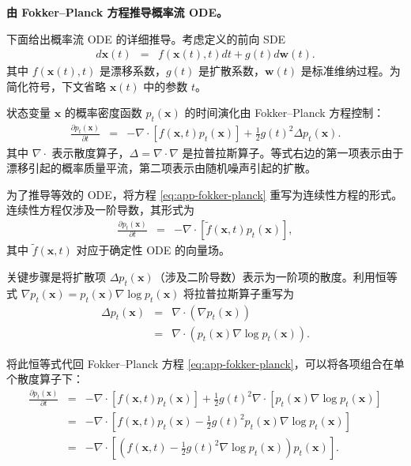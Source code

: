 \documentclass[UTF8,a4paper,zihao=-4,oneside,openany]{ctexbook}
\begin{document}
\textbf{由 Fokker--Planck 方程推导概率流 ODE。}

下面给出概率流 ODE 的详细推导。考虑定义的前向 SDE
\begin{eqnarray}
d\mathbf{x}(t) & = & f(\mathbf{x}(t), t) dt + g(t) d\mathbf{w}(t).
\end{eqnarray}
其中 $f(\mathbf{x}(t), t)$ 是漂移系数，$g(t)$ 是扩散系数，$\mathbf{w}(t)$ 是标准维纳过程。为简化符号，下文省略 $\mathbf{x}(t)$ 中的参数 $t$。

状态变量 $\mathbf{x}$ 的概率密度函数 $p_t(\mathbf{x})$ 的时间演化由 Fokker--Planck 方程控制：
\begin{eqnarray}
\frac{\partial p_t(\mathbf{x})}{\partial t} & = & -\nabla \cdot [f(\mathbf{x}, t) p_t(\mathbf{x})] + \frac{1}{2} g(t)^2 \Delta p_t(\mathbf{x}).
\label{eq:app-fokker-planck}
\end{eqnarray}
其中 $\nabla \cdot$ 表示散度算子，$\Delta = \nabla \cdot \nabla$ 是拉普拉斯算子。等式右边的第一项表示由于漂移引起的概率质量平流，第二项表示由随机噪声引起的扩散。

为了推导等效的 ODE，将方程 \eqref{eq:app-fokker-planck} 重写为连续性方程的形式。连续性方程仅涉及一阶导数，其形式为
\begin{eqnarray}
\frac{\partial p_t(\mathbf{x})}{\partial t} & = & -\nabla \cdot [\tilde{f}(\mathbf{x}, t) p_t(\mathbf{x})],
\label{eq:app-continuity}
\end{eqnarray}
其中 $\tilde{f}(\mathbf{x}, t)$ 对应于确定性 ODE 的向量场。

关键步骤是将扩散项 $\Delta p_t(\mathbf{x})$（涉及二阶导数）表示为一阶项的散度。利用恒等式 $\nabla p_t(\mathbf{x}) = p_t(\mathbf{x}) \nabla \log p_t(\mathbf{x})$ 将拉普拉斯算子重写为
\begin{eqnarray}
\Delta p_t(\mathbf{x}) & = & \nabla \cdot (\nabla p_t(\mathbf{x})) \nonumber \\
& = & \nabla \cdot (p_t(\mathbf{x}) \nabla \log p_t(\mathbf{x})).
\end{eqnarray}

将此恒等式代回 Fokker--Planck 方程 \eqref{eq:app-fokker-planck}，可以将各项组合在单个散度算子下：
\begin{eqnarray}
\frac{\partial p_t(\mathbf{x})}{\partial t} & = & -\nabla \cdot [f(\mathbf{x}, t) p_t(\mathbf{x})] + \frac{1}{2} g(t)^2 \nabla \cdot [p_t(\mathbf{x}) \nabla \log p_t(\mathbf{x})] \nonumber \\
& = & -\nabla \cdot \left[ f(\mathbf{x}, t) p_t(\mathbf{x}) - \frac{1}{2} g(t)^2 p_t(\mathbf{x}) \nabla \log p_t(\mathbf{x}) \right] \nonumber \\
& = & -\nabla \cdot \left[ \left( f(\mathbf{x}, t) - \frac{1}{2} g(t)^2 \nabla \log p_t(\mathbf{x}) \right) p_t(\mathbf{x}) \right].
\end{eqnarray}
\end{document}
